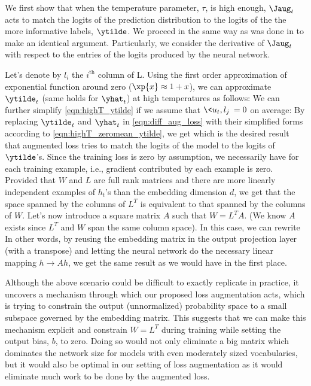 We first show that when the temperature parameter, $\tau$, is high enough, $\Jaug_t$ acts to match the logits of the prediction distribution to the logits of the the more informative labels, $\ytilde$.
 We proceed in the same way as was done in \citet{hinton2015distilling} to make an identical argument.
Particularly, we consider the derivative of $\Jaug_t$ with respect to the entries of the logits produced by the neural network.

Let's denote by $l_i$ the $i^\text{th}$ column of L. Using the first order approximation of exponential function around zero ($\xp{x}\approx 1+x$), we can approximate $\ytilde_t$ (same holds for $\yhat_t$) at high temperatures as follows:
We can further simplify \eqref{eqn:highT_ytilde} if we assume that $\<u_t,l_j\>=0$ on average:
By replacing $\ytilde_t$ and $\yhat_t$ in \eqref{eqn:diff_aug_loss} with their simplified forms according to \eqref{eqn:highT_zeromean_ytilde}, we get
which is the desired result that augmented loss tries to match the logits of the model to the logits of $\ytilde$'s.
Since the training loss is zero by assumption, we necessarily have
for each training example, i.e., gradient contributed by each example is zero.
Provided that $W$ and $L$ are full rank matrices and there are more linearly independent examples of $h_t$'s than the embedding dimension $d$, we get that the space spanned by the columns of $L^T$ is equivalent to that spanned by the columns of $W$.
Let's now introduce a square matrix $A$ such that $W=L^TA$. (We know $A$ exists since $L^T$ and $W$ span the same column space).
In this case, we can rewrite 
In other words, by reusing the embedding matrix in the output projection layer (with a transpose) and letting the neural network do the necessary linear mapping $h\rightarrow Ah$, we get the same result as we would have in the first place.

Although the above scenario could be difficult to exactly replicate in practice, it uncovers a mechanism through which our proposed loss augmentation acts, which is trying to constrain the output (unnormalized) probability space to a small subspace governed by the embedding matrix.
 This suggests that we can make this mechanism explicit and constrain $W=L^T$ during training while setting the output bias, $b$, to zero.
  Doing so would not only eliminate a big matrix which dominates the network size for models with even moderately sized vocabularies, but it would also be optimal in our setting of loss augmentation as it would eliminate much work to be done by the augmented loss.




